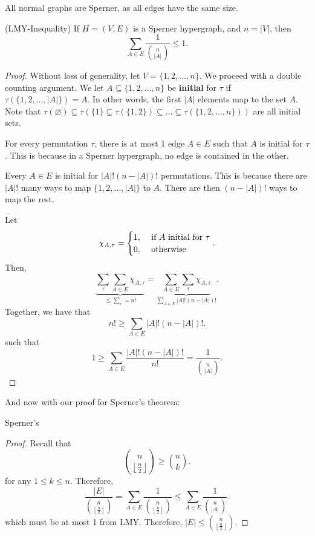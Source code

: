 
\begin{note}
	All normal graphs are Sperner, as all edges have the same size.
\end{note}

\begin{lemma}
	(LMY-Inequality) If \( H=(V,E) \) is a Sperner hypergraph, and \( n=|V| \), then \[
		\sum_{A \in E} \frac{1}{\binom{n}{|A|}} \le 1
	.\] 
\end{lemma}
\begin{proof}
	Without loss of generality, let \( V = \{1, 2, \ldots , n\}   \). We proceed with a double counting argument. We let \( A \subseteq \{1, 2, \ldots ,n \}   \) be \textbf{initial} for \( \tau  \) if \( \tau (\{1, 2, \ldots , |A|\}  ) =A\). In other words, the first \( |A| \) elements map to the set \( A \). Note that \( \tau (\varnothing) \subseteq \tau (\{1\} \subseteq \tau (\{1,2\}  ) \subseteq \ldots \subseteq \tau (\{1, 2, \ldots , n\}  ) )\) are all initial sets.

	\begin{observation}
		For every permutation \( \tau  \), there is at most 1 edge \( A \in E \) such that \( A \) is initial for \( \tau  \). This is because in a Sperner hypergraph, no edge is contained in the other.
	\end{observation}

	\begin{observation}
		Every \( A \in E \) is initial for \( |A|!(n-|A|)! \) permutations. This is because there are \( |A|! \) many ways to map \( \{1, 2, \ldots , |A|\}   \) to \( A \). There are then \( (n-|A|)! \) ways to map the rest.
	\end{observation}

	Let \[
		\chi_{A, \tau }= \begin{cases}
			1, &\text{ if \( A \) initial for \( \tau  \)}\\
			0, &\text{ otherwise}
		\end{cases}
	.\] Then, \[
		\underbrace{\sum_{\tau }\sum_{A \in E} \chi_{A,\tau }}_{\le \sum_{\tau } = n!} = \underbrace{\sum_{A \in E}\sum_{\tau } \chi_{A,\tau }}_{\sum_{A \in E}|A|!(n-|A|)!}
	.\] Together, we have that \[
		n! \ge \sum_{A \in E}|A|!(n-|A|)!
	.\] such that \[
		1 \ge \sum_{A \in E} \frac{|A|!(n-|A|)!}{n!} = \frac{1}{\binom{n}{|A|}}
	.\] 
\end{proof}

And now with our proof for Sperner's theorem:

\begin{theorem}
	Sperner's
\end{theorem}
\begin{proof}
	Recall that \[
		\binom{n}{\left\lfloor \frac{n}{2} \right\rfloor} \ge \binom{n}{k}
	.\] for any \( 1\le k\le n \). Therefore, \[
		\frac{|E|}{\binom{n}{\left\lfloor \frac{n}{2} \right\rfloor}} = \sum_{A \in E} \frac{1}{\binom{n}{\left\lfloor \frac{n}{2} \right\rfloor}} \le \sum_{A \in E}\frac{1}{\binom{n}{|A|}}
	.\] which must be at most 1 from LMY. Therefore, \( |E| \le \binom{n}{\left\lfloor \frac{n}{2} \right\rfloor} \).
\end{proof}
